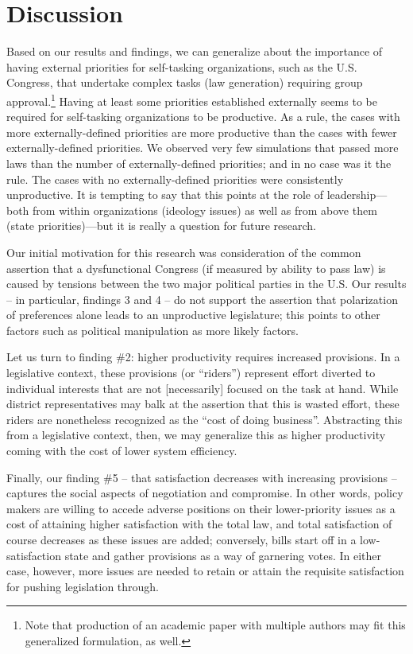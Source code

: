 \documentclass[pdftex,12pt]{llncs}
\begin{document}
\section{Discussion}
%
Based on our results and findings, we can generalize about the importance of having external priorities for self-tasking organizations, such as the U.S. Congress, that undertake complex tasks (law generation) requiring group approval.\footnote{Note that production of an academic paper with multiple authors may fit this generalized formulation, as well.}
Having at least some priorities established externally seems to be required for self-tasking organizations to be productive. 
As a rule, the cases with more externally-defined priorities are more productive than the cases with fewer externally-defined priorities. 
We observed very few simulations that passed more laws than the number of externally-defined priorities; and in no case was it the rule. 
The cases with no externally-defined priorities were consistently unproductive. 
It is tempting to say that this points at the role of leadership---both from within organizations (ideology issues) as well as from above them (state priorities)---but it is really a question for future research.

Our initial motivation for this research was consideration of the common assertion that a dysfunctional Congress (if measured by ability to pass law) is caused by tensions between the two major political parties in the U.S.
Our results -- in particular, findings 3 and 4 -- do not support the assertion that polarization of preferences alone leads to an unproductive legislature; this points to other factors such as political manipulation as more likely factors.

Let us turn to finding \#2: higher productivity requires increased provisions.
In a legislative context, these provisions (or ``riders'') represent effort diverted to individual interests that are not [necessarily] focused on the task at hand.
While district representatives may balk at the assertion that this is wasted effort, these riders are nonetheless recognized as the ``cost of doing business''.
Abstracting this from a legislative context, then, we may generalize this as higher productivity coming with the cost of lower system efficiency.

Finally, our finding \#5 -- that satisfaction decreases with increasing provisions -- captures the social aspects of negotiation and compromise.  
In other words, policy makers are willing to accede adverse positions on their lower-priority issues as a cost of attaining higher satisfaction with the total law, and total satisfaction of course decreases as these issues are added; conversely, bills start off in a low-satisfaction state and gather provisions as a way of garnering votes.  In either case, however, more issues are needed to retain or attain the requisite satisfaction for pushing legislation through.
\end{document}
